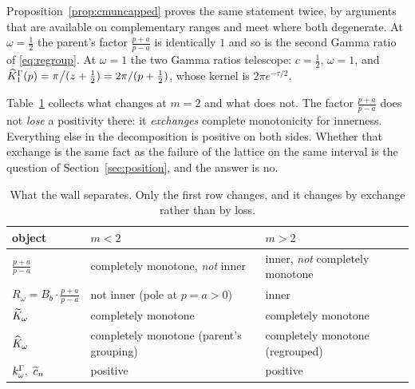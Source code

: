 \begin{remark}\label{rem:exchange}
Proposition~\ref{prop:cmuncapped} proves the same statement twice, by arguments
that are available on complementary ranges and meet where both degenerate. At
$\omega=\frac12$ the parent's factor $\frac{p+a}{p-a}$ is identically $1$ and so
is the second Gamma ratio of \eqref{eq:regroup}. At $\omega=1$ the two Gamma
ratios telescope: $c=\frac12$, $\omega=1$, and
$\widehat K^\Gamma_1(p)=\pi\big/(z+\frac12)=2\pi/(p+\frac12)$, whose kernel is
$2\pi e^{-\tau/2}$.
\end{remark}

\begin{remark}\label{rem:trade}
Table~\ref{tab:trade} collects what changes at $m=2$ and what does not. The
factor $\frac{p+a}{p-a}$ does not \emph{lose} a positivity there: it
\emph{exchanges} complete monotonicity for innerness. Everything else in the
decomposition is positive on both sides. Whether that exchange is the same fact
as the failure of the lattice on the same interval is the question of
Section~\ref{sec:position}, and the answer is no.
\end{remark}

\begin{table}[ht]\centering\small
\caption{What the wall separates. Only the first row changes, and it changes by
exchange rather than by loss.}\label{tab:trade}
\begin{tabular}{@{}lll@{}}
\toprule
object & $m<2$ & $m>2$\\
\midrule
$\frac{p+a}{p-a}$ & completely monotone, \emph{not} inner & inner, \emph{not} completely monotone\\
$R_\omega=B_b\cdot\frac{p+a}{p-a}$ & not inner (pole at $p=a>0$) & inner\\
$\widetilde K_\omega$ & completely monotone & completely monotone\\
$\widehat K_\omega$ & completely monotone (parent's grouping) & completely monotone (regrouped)\\
$k^\Gamma_\omega,\ \widetilde c_n$ & positive & positive\\
\bottomrule
\end{tabular}
\end{table}
